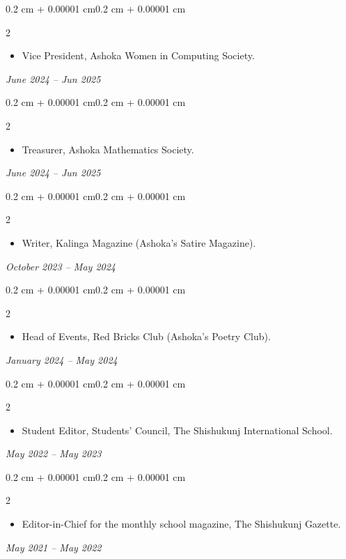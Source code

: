 \documentclass[10pt, letterpaper]{article}
\newenvironment{highlights}{
    \begin{itemize}[
        topsep=0.10 cm,
        parsep=0.10 cm,
        partopsep=0pt,
        itemsep=0pt,
        leftmargin=0.4 cm + 10pt
    ]
}{
    \end{itemize}
} %
\newenvironment{twocolentry}[2][]{
    \begin{adjustwidth}{0.2 cm + 0.00001 cm}{0.2 cm + 0.00001 cm}
    \def\secondColumn{#2}
    \setcolumnwidth{\fill, 4.5 cm}
    \begin{paracol}{2}
}{
    \switchcolumn \raggedleft \secondColumn
    \end{paracol}
    \end{adjustwidth}
} %
\begin{document}
        \begin{twocolentry}{\textit{June 2024 -- Jun 2025}}
            \begin{highlights}
                \item Vice President, Ashoka Women in Computing Society.
            \end{highlights}
        \end{twocolentry}

        \begin{twocolentry}{\textit{June 2024 -- Jun 2025}}
            \begin{highlights}
                \item Treasurer, Ashoka Mathematics Society.
            \end{highlights}
        \end{twocolentry}
        
        \begin{twocolentry}{\textit{October 2023 -- May 2024}}
            \begin{highlights}
                \item Writer, Kalinga Magazine (Ashoka's Satire Magazine).
            \end{highlights}
        \end{twocolentry}

        \begin{twocolentry}{\textit{January 2024 -- May 2024}}
            \begin{highlights}
                \item Head of Events, Red Bricks Club (Ashoka's Poetry Club).
            \end{highlights}
        \end{twocolentry}
        
        
        \begin{twocolentry}{\textit{May 2022 -- May 2023}}
            \begin{highlights}
                \item Student Editor, Students' Council, The Shishukunj International School.
            \end{highlights}
        \end{twocolentry}

        \begin{twocolentry}{\textit{May 2021 -- May 2022}}
            \begin{highlights}
                \item Editor-in-Chief for the monthly school magazine, The Shishukunj Gazette.
            \end{highlights}
        \end{twocolentry}


    
\end{document}
